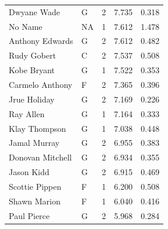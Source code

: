 \begin{table}[t]
\begin{tabular*}{\linewidth}{@{\extracolsep{\fill}}llcrr}
Dwyane Wade & G & 2 & 7.735 & 0.318 \\ 
No Name & NA & 1 & 7.612 & 1.478 \\ 
Anthony Edwards & G & 2 & 7.612 & 0.482 \\ 
Rudy Gobert & C & 2 & 7.537 & 0.508 \\ 
Kobe Bryant & G & 1 & 7.522 & 0.353 \\ 
Carmelo Anthony & F & 2 & 7.365 & 0.396 \\ 
Jrue Holiday & G & 2 & 7.169 & 0.226 \\ 
Ray Allen & G & 1 & 7.164 & 0.333 \\ 
Klay Thompson & G & 1 & 7.038 & 0.448 \\ 
Jamal Murray & G & 2 & 6.955 & 0.383 \\ 
Donovan Mitchell & G & 2 & 6.934 & 0.355 \\ 
Jason Kidd & G & 2 & 6.915 & 0.469 \\ 
Scottie Pippen & F & 1 & 6.200 & 0.508 \\ 
Shawn Marion & F & 1 & 6.040 & 0.416 \\ 
Paul Pierce & G & 2 & 5.968 & 0.284 \\ 
\bottomrule
\end{tabular*}
\end{table}

